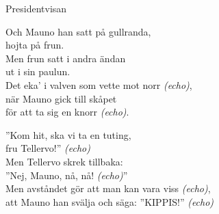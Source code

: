 \begin{song}{Presidentvisan}

	
	Och Mauno han satt på gullranda,\\
	hojta på frun.\\
	Men frun satt i andra ändan\\
	ut i sin paulun.\\
	Det eka' i valven som vette mot norr \emph{(echo)},\\
	när Mauno gick till skåpet\\
	för att ta sig en knorr \emph{(echo)}.
	
	''Kom hit, ska vi ta en tuting,\\
	fru Tellervo!'' \emph{(echo)}\\
	Men Tellervo skrek tillbaka:\\
	''Nej, Mauno, nå, nå! \emph{(echo)}''\\
	Men avståndet gör att man kan vara viss \emph{(echo)},\\
	att Mauno han svälja och säga: ''KIPPIS!'' \emph{(echo)}
	
\end{song}
